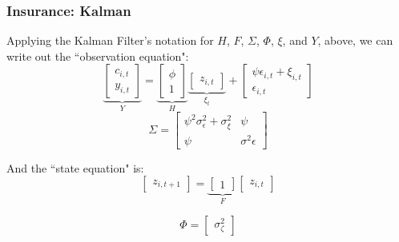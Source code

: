 \documentclass{beamer}
\begin{document}
\begin{frame}
\frametitle[alignment=center]{Insurance: Kalman}
Applying the Kalman Filter's notation for $H$, $F$, $\Sigma$, $\Phi$, $\xi$, and $Y$, above, we can write out the ``observation equation":
$$\underbrace{\left[\begin{array}{c} c_{i,t} \\   y_{i,t} \end{array}\right]}_{Y}=\underbrace{\left[\begin{array}{cccccc}   \phi  \\ 1 \end{array}\right]}_{H}\underbrace{\left[\begin{array}{c}   z_{i,t }  \end{array}\right]}_{\xi_t}+\left[\begin{array}{c}\psi\epsilon_{i,t}+\xi_{i,t} \\  \epsilon_{i,t} \end{array}\right]$$
$$\Sigma=\left[\begin{array}{cc}\psi^2 \sigma^2_\epsilon+\sigma^2_\xi & \psi \\ \psi & \sigma^2\epsilon \end{array}\right]$$

And the ``state equation" is:
$$\left[\begin{array}{c}   z_{i,t+1 }\end{array}\right]=\underbrace{\left[\begin{array}{cccc} 1 \end{array}\right]}_{F}\left[\begin{array}{c}   z_{i,t }\end{array}\right]$$

$$\Phi = \left[\begin{array}{c}\sigma^2_\zeta\end{array}\right]$$
\end{frame}
\end{document}

